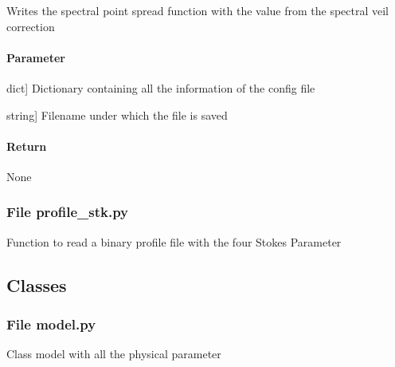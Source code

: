 \documentclass[letterpaper,10pt,english]{sphinxmanual}
\begin{document}
\begin{fulllineitems}
\label{\detokenize{functions:obs.write_psf}}
\pysigstartsignatures
{}
\pysigstopsignatures
\sphinxAtStartPar
Writes the spectral point spread function with the value from the spectral veil correction


\paragraph{Parameter}
\label{\detokenize{functions:id38}}\begin{description}
\sphinxlineitem{config}{[}dict{]}
\sphinxAtStartPar
Dictionary containing all the information of the config file

\sphinxlineitem{filename}{[}string{]}
\sphinxAtStartPar
Filename under which the file is saved

\end{description}


\paragraph{Return}
\label{\detokenize{functions:id39}}
\sphinxAtStartPar
None

\end{fulllineitems}



\subsubsection{File profile\_stk.py}
\label{\detokenize{functions:file-profile-stk-py}}
\sphinxAtStartPar
Function to read a binary profile file with the four Stokes Parameter

\sphinxstepscope


\subsection{Classes}
\label{\detokenize{classes:classes}}\label{\detokenize{classes::doc}}

\subsubsection{File model.py}
\label{\detokenize{classes:file-model-py}}
\sphinxAtStartPar
Class model with all the physical parameter
\end{document}
